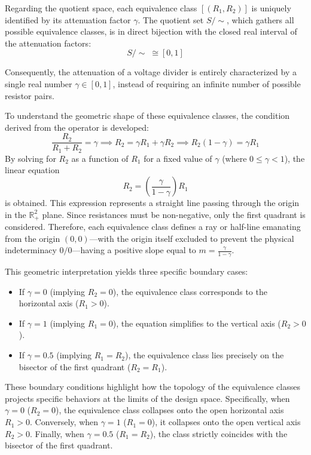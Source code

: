 \documentclass[11pt, a4paper]{article}
\begin{document}
Regarding the quotient space, each equivalence class $[(R_1, R_2)]$ is uniquely
identified by its attenuation factor $\gamma$. The quotient set $S/\!\!\sim$,
which gathers all possible equivalence classes, is in direct bijection with the
closed real interval of the attenuation factors:
\[ S/\sim \; \cong [0, 1] \]

Consequently, the attenuation of a voltage divider is entirely characterized by
a single real number $\gamma \in [0, 1]$, instead of requiring an infinite
number of possible resistor pairs.


To understand the geometric shape of these equivalence classes, the condition derived from the operator is developed:
\[
\frac{R_2}{R_1 + R_2} = \gamma \implies R_2 = \gamma R_1 + \gamma R_2 \implies R_2(1 - \gamma) = \gamma R_1
\]
By solving for $R_2$ as a function of $R_1$ for a fixed value of $\gamma$
(where $0 \leq \gamma < 1$), the linear equation
\[
R_2 = \left( \frac{\gamma}{1 - \gamma} \right) R_1
\]
is obtained. This expression represents a straight line passing through the origin in the
$\mathbb{R}_+^2$ plane. Since resistances must be non-negative, only the first quadrant is considered. Therefore, each equivalence class defines a ray or half-line
emanating from the origin $(0,0)$—with the origin itself excluded to prevent the
physical indeterminacy $0/0$—having a positive slope equal to $m = \frac{\gamma}{1 - \gamma}$.

This geometric interpretation yields three specific boundary cases:
\begin{itemize}
	\item If $\gamma = 0$ (implying $R_2 = 0$), the equivalence class corresponds to the horizontal axis ($R_1 > 0$).
	\item If $\gamma = 1$ (implying $R_1 = 0$), the equation simplifies to the vertical axis ($R_2 > 0$).
	\item If $\gamma = 0.5$ (implying $R_1 = R_2$), the equivalence class lies precisely on the bisector of the first quadrant ($R_2 = R_1$).
\end{itemize}

These boundary conditions highlight how the topology of the equivalence classes
projects specific behaviors at the limits of the design space. Specifically,
when $\gamma = 0$ ($R_2 = 0$), the equivalence class collapses onto the open
horizontal axis $R_1 > 0$. Conversely, when $\gamma = 1$ ($R_1 = 0$), it
collapses onto the open vertical axis $R_2 > 0$. Finally, when $\gamma = 0.5$
($R_1 = R_2$), the class strictly coincides with the bisector of the first quadrant.
\end{document}
